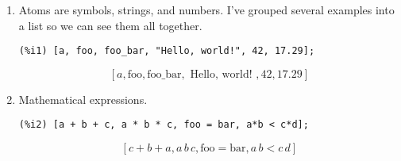 \documentclass[12pt,leqno]{article}
\begin{document}
\begin{enumerate}

\item Atoms are symbols, strings, and numbers.
I've grouped several examples into a list so we can see them all together.
\begin{verbatim}
(%i1) [a, foo, foo_bar, "Hello, world!", 42, 17.29];
\end{verbatim}
\begin{equation}
\left[ a , \mathrm{foo} , \mathrm{foo\_bar} , \mbox{ Hello, world! } , 42 , 17.29 \right] \tag{\%o1}
\label{eq:doc-group1-code6-1}
\end{equation}

\item Mathematical expressions.
\begin{verbatim}
(%i2) [a + b + c, a * b * c, foo = bar, a*b < c*d];
\end{verbatim}
\begin{equation}
\left[ c+b+a , a\,b\,c , \mathrm{foo}=\mathrm{bar} , a\,b<c\,d \right] \tag{\%o2}
\label{eq:doc-group1-code7-1}
\end{equation}



\end{enumerate}
\end{document}
